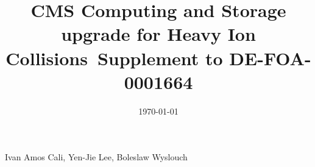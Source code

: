 \begin{titlepage}
\vspace{-.2 cm} 
\date{\today}
\vspace{2 cm}
\title{CMS Computing and Storage upgrade for Heavy Ion Collisions\ Supplement to DE-FOA-0001664 }

\vspace{.2 cm} 
\begin{Authlist}
Ivan Amos Cali\footnotemark[1],
Yen-Jie Lee\footnotemark[1], 
Boleslaw Wyslouch\footnotemark[1]
\end{Authlist}



\end{titlepage}





